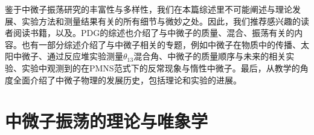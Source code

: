 \documentclass{article}
\begin{document}
	鉴于中微子振荡研究的丰富性与多样性，我们在本篇综述里不可能阐述与理论发展、实验方法和测量结果有关的所有细节与微妙之处。因此，我们推荐感兴趣的读者阅读书籍\cite{FukugitaYanagida2003}\cite{MohapatraPal2004}\cite{GiuntiKim2007}\cite{Bilenky2010}，以及\cite{Zuber2011}\cite{Barger2012}\cite{ValleRomao2015}\cite{Suekane2015}。PDG的综述也介绍了与中微子的质量、混合、振荡有关的内容\cite{Patrignani2016}。也有一部分综述介绍了与中微子相关的专题，例如中微子在物质中的传播\cite{Blennow2013}\cite{Kuo1989}、太阳中微子\cite{Ianni2017}、通过反应堆实验测量$\theta_{13}$混合角\cite{Lachenmaier2015}、中微子的质量顺序与未来的相关实验\cite{Qian2015}、实验中观测到的在PMNS范式下的反常现象与惰性中微子\cite{Abazajian2012}\cite{Gariazzo2016}。最后，\cite{Bilenky2013}从教学的角度全面介绍了中微子物理的发展历史，包括理论和实验的进展。
	
	\section{中微子振荡的理论与唯象学\label{section2}}
\end{document}
